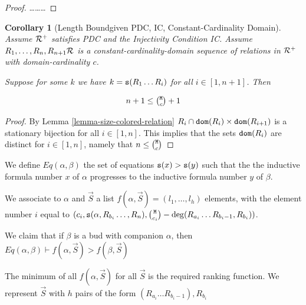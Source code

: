 \documentclass{lmcs}
\newtheorem{corollary}[theorem]{Corollary}
\begin{document}
\begin{proof}
\ldots\ldots\ldots
\end{proof}

\begin{corollary}[Length Boundgiven PDC, IC, Constant-Cardinality Domain]
Assume ${\mathcal R}^+$ satisfies PDC and the Injectivity Condition IC. 
Assume $R_1, \ldots, R_n, R_{n+1} {\mathcal R}$ is a constant-cardinality-domain sequence of 
relations in ${\mathcal R}^+$ with domain-cardinality $c$.

Suppose for some $k$
we have $k = {\tt s}(R_1 \ldots R_i)$ for all $i \in [1,n+1]$. Then

$$n+1 \le \newton{\MaxInd}{c}+1$$ 
\end{corollary}

\begin{proof}
By Lemma \ref{lemma-size-colored-relation} 
$R_i \cap {\tt dom}(R_i) \times {\tt dom}(R_{i+1})$ is a stationary bijection for all $i \in [1,n ]$.
This implies that the sets ${\tt dom}(R_i)$ are distinct for $i \in [1,n ]$, namely that 
$n \le  \newton{\MaxInd}{c}$
\end{proof}


We define $Eq(\alpha, \beta)$ the set of equations ${\tt s}(x) > {\tt s}(y)$ such that the
the inductive formula number $x$ of $\alpha$ progresses to the inductive formula number $y$
 of $\beta$.
 
 We associate to $\alpha$ and $\vec{S}$ a list 
 $f(\alpha,\vec{S})=(l_1, \ldots, l_h)$ elements, with the element 
 number $i$ equal to 
 $(
 c_i, 
 \size(\alpha, R_{b_i}\ldots, R_n), 
 \newton{\MaxInd}{c_i} - \deg(R_{a_i} \ldots R_{b_i-1}, R_{b_i})
 )$.
 

We claim that if $\beta$ is a bud with companion $\alpha$, then 
$Eq(\alpha, \beta) \vdash f(\alpha,\vec{S}) > f(\beta,\vec{S})$

The minimum of all $f(\alpha,\vec{S})$ for all $\vec{S}$ is the required ranking function.
We represent $\vec{S}$ with $h$ pairs of the form $(R_{a_i}\ldots R_{b_i-1}),R_{b_i}$




 
\end{document}
